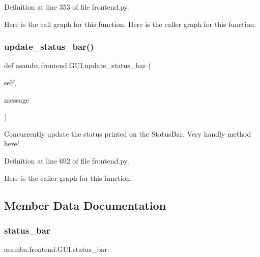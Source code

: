 Definition at line 353 of file frontend.\+py.

Here is the call graph for this function\+:
Here is the caller graph for this function\+:
\mbox{\label{classasamba_1_1frontend_1_1_g_u_i_a9b882f15d916eb942b202888fa29cf12}} 
\subsubsection{\texorpdfstring{update\+\_\+status\+\_\+bar()}{update\_status\_bar()}}
{\footnotesize\ttfamily def asamba.\+frontend.\+G\+U\+I.\+update\+\_\+status\+\_\+bar (\begin{DoxyParamCaption}\item[{}]{self,  }\item[{}]{message }\end{DoxyParamCaption})}

\begin{DoxyVerb}Concurrently update the status printed on the StatusBar. Very handly method here! \end{DoxyVerb}
 

Definition at line 692 of file frontend.\+py.

Here is the caller graph for this function\+:


\subsection{Member Data Documentation}
\mbox{\label{classasamba_1_1frontend_1_1_g_u_i_a05a2765e23aaed2a4380f7089f387dbd}} 
\subsubsection{\texorpdfstring{status\+\_\+bar}{status\_bar}}
{\footnotesize\ttfamily asamba.\+frontend.\+G\+U\+I.\+status\+\_\+bar}



